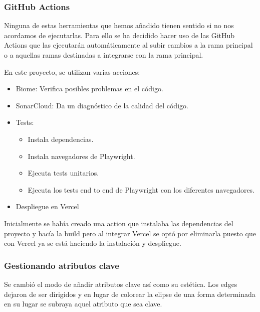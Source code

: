 
\subsubsection{GitHub Actions}
Ninguna de estas herramientas que hemos añadido tienen sentido si no nos acordamos de ejecutarlas. Para ello se ha decidido hacer uso de las GitHub Actions que las ejecutarán automáticamente al subir cambios a la rama principal o a aquellas ramas destinadas a integrarse con la rama principal.

En este proyecto, se utilizan varias acciones:
\begin{itemize}
\tightlist
    \item Biome: Verifica posibles problemas en el código.
    \item SonarCloud: Da un diagnóstico de la calidad del código.
    \item Tests: 
    \begin{itemize}
        \tightlist
        \item Instala dependencias.
        \item Instala navegadores de Playwright.
        \item Ejecuta tests unitarios.
        \item Ejecuta los tests end to end de Playwright con los diferentes navegadores.
    \end{itemize}
    \item Despliegue en Vercel
\end{itemize}

Inicialmente se había creado una action que instalaba las dependencias del proyecto y hacía la build pero al integrar Vercel se optó por eliminarla puesto que con Vercel ya se está haciendo la instalación y despliegue.



\subsubsection{Gestionando atributos clave}
Se cambió el modo de añadir atributos clave así como su estética. Los edges dejaron de ser dirigidos y en lugar de colorear la elipse de una forma determinada en su lugar se subraya aquel atributo que sea clave.


